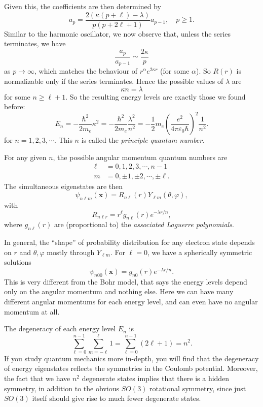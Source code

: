 \documentclass[a4paper]{article}
\begin{document}
Given this, the coefficients are then determined by
\[
  a_p = \frac{2(\kappa (p + \ell) - \lambda)}{p(p + 2\ell + 1)} a_{p - 1}, \quad p \geq 1.
\]
Similar to the harmonic oscillator, we now observe that, unless the series terminates, we have
\[
  \frac{a_p}{a_{p - 1}} \sim \frac{2\kappa}{p}
\]
as $p \to \infty$, which matches the behaviour of $r^\alpha e^{2 \kappa r}$ (for some $\alpha$). So $R(r)$ is normalizable only if the series terminates. Hence the possible values of $\lambda$ are
\[
  \kappa n = \lambda
\]
for some $n \geq \ell + 1$. So the resulting energy levels are exactly those we found before:
\[
  E_n = -\frac{\hbar^2}{2 m_e} \kappa^2 = -\frac{\hbar^2}{2 m_e} \frac{\lambda^2}{n^2} = -\frac{1}{2}m_e\left(\frac{e^2}{4 \pi \varepsilon_0 \hbar}\right)^2 \frac{1}{n^2}.
\]
for $n = 1, 2, 3, \cdots$. This $n$ is called the \emph{principle quantum number}.

For any given $n$, the possible angular momentum quantum numbers are
\begin{align*}
  \ell &= 0, 1, 2, 3, \cdots, n - 1\\
  m &= 0, \pm 1, \pm 2, \cdots, \pm \ell.
\end{align*}
The simultaneous eigenstates are then
\[
  \psi_{n\ell m} (\mathbf{x}) = R_{n\ell}(r)Y_{\ell m}(\theta, \varphi),
\]
with
\[
  R_{n\ell r} = r^\ell g_{n\ell}(r)e^{-\lambda r/n},
\]
where $g_{n\ell}(r)$ are (proportional to) the \emph{associated Laguerre polynomials}.

In general, the ``shape'' of probability distribution for any electron state depends on $r$ and $\theta, \varphi$ mostly through $Y_{\ell m}$. For $\ell = 0$, we have a spherically symmetric solutions
\[
  \psi_{n00}(\mathbf{x}) = g_{n0}(r) e^{-\lambda r/n}.
\]
This is very different from the Bohr model, that says the energy levels depend only on the angular momentum and nothing else. Here we can have many different angular momentums for each energy level, and can even have no angular momentum at all.

The degeneracy of each energy level $E_n$ is
\[
  \sum_{\ell = 0}^{n - 1} \sum_{m = -\ell}^\ell 1 = \sum_{\ell = 0}^{n - 1} (2\ell + 1) = n^2.
\]
If you study quantum mechanics more in-depth, you will find that the degeneracy of energy eigenstates reflects the symmetries in the Coulomb potential. Moreover, the fact that we have $n^2$ degenerate states implies that there is a hidden symmetry, in addition to the obvious $SO(3)$ rotational symmetry, since just $SO(3)$ itself should give rise to much fewer degenerate states.
\end{document}
